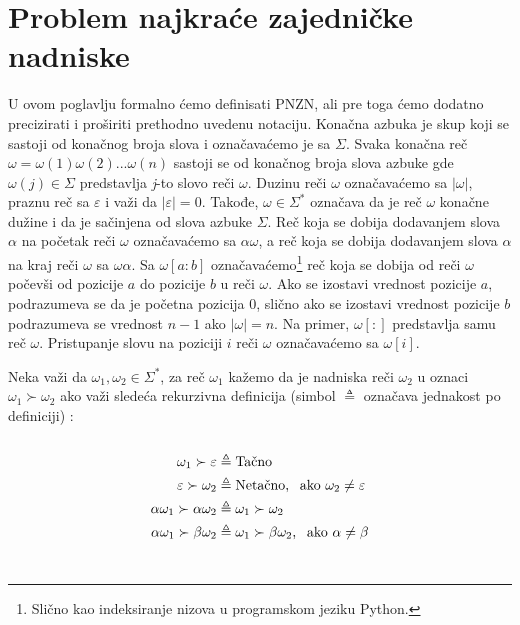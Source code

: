 \documentclass[12pt,oneside]{memoir}
\begin{document}
\section{Problem najkraće zajedničke nadniske}
U ovom poglavlju formalno ćemo definisati PNZN, ali pre toga ćemo dodatno precizirati i proširiti prethodno uvedenu notaciju. Konačna azbuka je skup koji se sastoji
od konačnog broja slova i označavaćemo je sa $\Sigma$. Svaka konačna reč
$\omega=\omega(1)\omega(2)...\omega(n)$ sastoji se od konačnog broja slova azbuke gde $\omega(j)\in\Sigma$ predstavlja \textit{j}-to slovo reči $\omega$. 
Duzinu reči $\omega$ označavaćemo sa $|\omega|$, praznu reč sa $\varepsilon$ i važi da $|\varepsilon|=0$. 
Takođe, $\omega\in\Sigma^{*}$ označava da je reč $\omega$ konačne dužine i da je sačinjena od slova
azbuke $\Sigma$.
Reč koja se dobija dodavanjem
slova $\alpha$ na početak reči $\omega$ označavaćemo sa $\alpha\omega$,
a reč koja se dobija dodavanjem slova $\alpha$ na kraj reči $\omega$ sa $\omega\alpha$.
Sa $\omega[a:b]$ označavaćemo\footnote{Slično kao indeksiranje nizova u programskom jeziku Python.} reč koja se dobija od
reči $\omega$ počevši od pozicije $a$ do pozicije $b$ u reči $\omega$. Ako se izostavi vrednost pozicije $a$, podrazumeva se
da je početna pozicija 0, slično ako se izostavi vrednost pozicije $b$ podrazumeva se vrednost $n-1$ ako $|\omega|=n$.
Na primer, $\omega[:]$ predstavlja samu reč $\omega$. Pristupanje slovu na poziciji $i$ reči $\omega$ 
označavaćemo sa $\omega[i]$.

Neka važi da $\omega_{1},\omega_{2}\in\Sigma^*$, za reč $\omega_{1}$ kažemo da je
nadniska reči $\omega_{2}$ u oznaci $\omega_{1}\succ\omega_{2}$ ako važi sledeća
rekurzivna definicija (simbol $\triangleq$ označava jednakost po definiciji) \cite{ProbabilisticBS}:
\\
\\
\begin{equation}
\begin{aligned}
\omega_{1}\succ\varepsilon &\triangleq \textrm{Tačno}\\
\varepsilon\succ\omega_{2} &\triangleq \textrm{Netačno, \:\:ako } \omega_{2}\neq\varepsilon\\
\alpha\omega_{1}\succ\alpha\omega_{2} &\triangleq \omega_{1}\succ\omega_{2}\\
\alpha\omega_{1}\succ\beta\omega_{2} &\triangleq \omega_{1}\succ\beta\omega_{2} \textrm{, \:\:ako } \alpha\neq\beta
\end{aligned}
\end{equation}
\\
\end{document}
